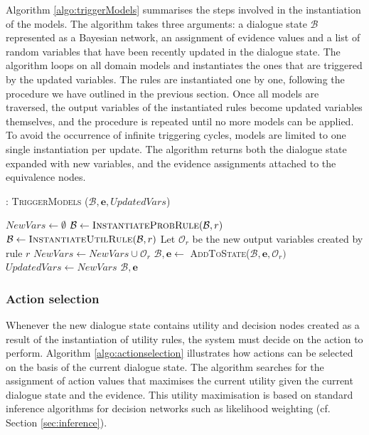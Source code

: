 Algorithm \ref{algo:triggerModels} summarises the steps involved in the instantiation of the models. The algorithm takes three arguments: a dialogue state $\mathcal{B}$ represented as a Bayesian network, an assignment of evidence values and a list of random variables that have been recently updated in the dialogue state. The algorithm loops on all domain models and instantiates the ones that are triggered by the updated variables. The rules are instantiated one by one, following the procedure we have outlined in the previous section. Once all models are traversed, the output variables of the instantiated rules become updated variables themselves, and the procedure is repeated until no more models can be applied.  To avoid the occurrence of infinite triggering cycles, models are limited to one single instantiation per update. The algorithm returns both the dialogue state expanded with new variables, and the evidence assignments attached to the equivalence nodes. 


\begin{algorithm}[t]
\caption{: \textsc{TriggerModels} ($\mathcal{B}, \mathbf{e}, \mathit{UpdatedVars}$)}
\begin{algorithmic}[1] \vspace{1mm}
\STATE $\mathit{NewVars} \leftarrow \emptyset$
\STATE $\mathcal{B} \leftarrow \textsc{InstantiateProbRule}(\mathcal{B},r)$
\STATE $\mathcal{B} \leftarrow \textsc{InstantiateUtilRule}(\mathcal{B},r)$
\ENDIF
\STATE Let $\mathcal{O}_r$ be the new output variables created by rule $r$
\STATE $\mathit{NewVars} \leftarrow \mathit{NewVars} \cup \mathcal{O}_r$
\STATE $\mathcal{B}, \mathbf{e} \leftarrow $ \textsc{AddToState}($\mathcal{B}, \mathbf{e}, \mathcal{O}_r)$
\ENDFOR
\ENDIF
\ENDFOR 
\STATE $\mathit{UpdatedVars} \leftarrow \mathit{NewVars}$
\ENDWHILE 
\RETURN $\mathcal{B}, \mathbf{e}$
\end{algorithmic}
\label{algo:triggerModels}
\end{algorithm}


\subsubsection*{Action selection}

Whenever the new dialogue state contains utility and decision nodes created as a result of the instantiation of utility rules, the system must decide on the action to perform.  Algorithm \ref{algo:actionselection} illustrates how actions can be selected on the basis of the current dialogue state. The algorithm searches for the assignment of action values that maximises the current utility given the current dialogue state and the evidence. This utility maximisation is based on standard inference algorithms for decision networks such as likelihood weighting (cf. Section \ref{sec:inference}). 

